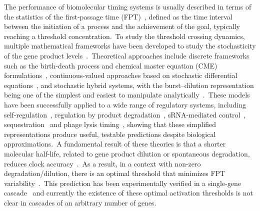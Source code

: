 \documentclass[aps,prb,reprint,superscriptaddress]{revtex4-2}
\begin{document}
The performance of biomolecular timing systems is usually described in terms of the statistics of the first-passage time (FPT)~\cite{ghusinga2017first}, defined as the time interval between the initiation of a process and the achievement of the goal, typically reaching a threshold concentration.~To study the threshold crossing dynamics, multiple mathematical frameworks have been developed to study the stochasticity of the gene product levels~\cite{Elowitz_Levine_Siggia_Swain_2002,Thattai_vanOudenaarden_2001, Ozbudak_Thattai_Kurtser_Grossman_vanOudenaarden_2002, Pedraza_Paulsson_2008}.~Theoretical approaches include discrete frameworks such as the birth-death process and chemical master equation (CME) formulations~\cite{Rao_Waxman_Lin_Song_2025}, continuous-valued approaches based on stochastic differential equations~\cite{rijal2022exact}, and stochastic hybrid systems, with the burst–dilution representation being one of the simplest and easiest to manipulate analytically~\cite{singh2010stochastic}.~These models have been successfully applied to a wide range of regulatory systems, including self-regulation~\cite{ghusinga2017first, Cao_Qiu_Zhou_Zhang_2019, co2017stochastic, rezaee2023optimizing}, regulation by product degradation~\cite{rezaee2024controlling}, sRNA-mediated control~\cite{Ali_Prasad_Das_2025}, sequestration~\cite{ Biswas_Dey_Singh_2024} and phage lysis timing~\cite{kannoly2020optimum, kannoly2022optimal}, showing that these simplified representations produce useful, testable predictions despite biological approximations.~A fundamental result of these theories is that a shorter molecular half-life, related to gene product dilution or spontaneous degradation, reduces clock accuracy~\cite{ghusinga2017first,rezaee2023optimizing}.~As a result, in a context with non-zero degradation/dilution, there is an optimal  threshold that minimizes FPT variability~\cite{co2017stochastic,nieto2022threshold}.~This prediction has been experimentally verified in a single-gene cascade~\cite{kannoly2022optimal} and currently the existence of these optimal activation thresholds is not clear in cascades of an arbitrary number of genes.
\end{document}

